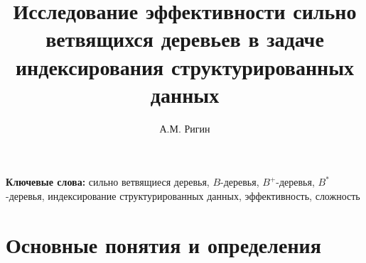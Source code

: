 \documentclass{llncs}
\begin{document}
	
	\title{Исследование эффективности сильно ветвящихся деревьев в задаче индексирования структурированных данных}
	
	\author{
		А.М. Ригин
	}
	
	
	\maketitle
	
	
	
	\textbf{Ключевые слова:} сильно ветвящиеся деревья, $B$-деревья, $B^+$-деревья, $B^*$-деревья, индексирование структурированных данных, эффективность, сложность
	
	\vspace{-1em}
	
	\section{Основные понятия и определения}
	
\end{document}
